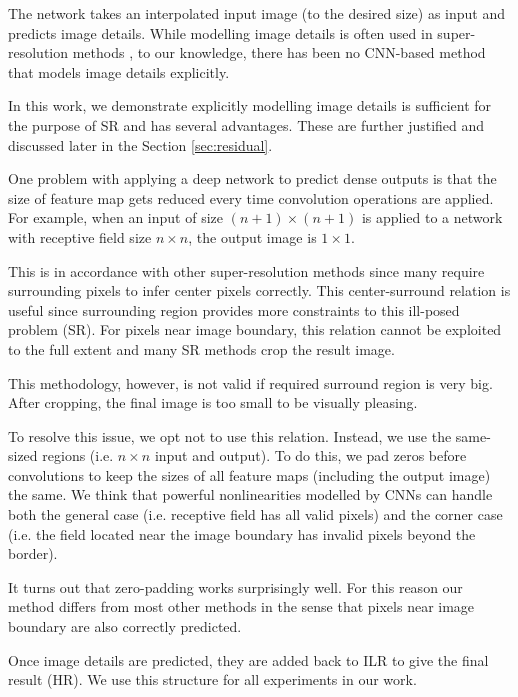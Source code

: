 \documentclass[10pt,twocolumn,letterpaper]{article}
\begin{document}
The network takes an interpolated input image (to the desired size) as input and predicts image details. While modelling image details is often used in super-resolution methods \cite{Timofte2013, Timofte, bevilacqua2012,bevilacqua2013super}, to our knowledge, there has been no CNN-based method that models image details explicitly.

In this work, we demonstrate explicitly modelling image details is sufficient for the purpose of SR and has several advantages. These are further justified and discussed later in the Section \ref{sec:residual}. 

One problem with applying a deep network to predict dense outputs is that the size of feature map gets reduced every time convolution operations are applied. For example,  when an input of size $(n+1)\times (n+1)$ is applied to a network with receptive field size $n\times n$, the output image is $1\times1$. 

This is in accordance with other super-resolution methods since many require surrounding pixels to infer center pixels correctly. This center-surround relation is useful since surrounding region provides more constraints to this ill-posed problem (SR). For pixels near image boundary, this relation cannot be exploited to the full extent and many SR methods crop the result image. 

This methodology, however, is not valid if required surround region is very big. After cropping, the final image is too small to be visually pleasing.

To resolve this issue, we opt not to use this relation. Instead, we use the same-sized regions (i.e. $n\times n$ input and output). To do this, we pad zeros before convolutions to keep the sizes of all feature maps (including the output image) the same. We think that powerful nonlinearities modelled by CNNs can handle both the general case (i.e. receptive field has all valid pixels) and the corner case (i.e. the field located near the image boundary has invalid pixels beyond the border).

It turns out that zero-padding works surprisingly well. For this reason our method differs from most other methods in the sense that pixels near image boundary are also correctly predicted. 

Once image details are predicted, they are added back to ILR to give the final result (HR). We use this structure for all experiments in our work.  
\end{document}
